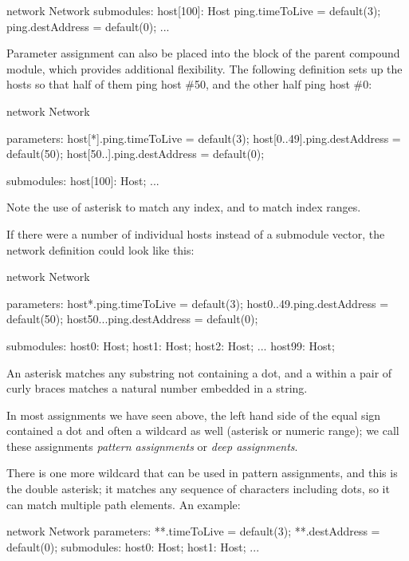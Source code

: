 \begin{ned}
network Network
{
    submodules:
        host[100]: Host {
            ping.timeToLive = default(3);
            ping.destAddress = default(0);
        }
        ...
}
\end{ned}

Parameter assignment can also be placed into the  block of the
parent compound module, which provides additional flexibility. The following
definition sets up the hosts so that half of them ping host \#50, and the other
half ping host \#0:

\begin{ned}
network Network
{
    parameters:
        host[*].ping.timeToLive = default(3);
        host[0..49].ping.destAddress = default(50);
        host[50..].ping.destAddress = default(0);

    submodules:
        host[100]: Host;
        ...
}
\end{ned}

Note the use of asterisk to match any index, and  to match index ranges.

If there were a number of individual hosts instead of a submodule vector, the
network definition could look like this:

\begin{ned}
network Network
{
    parameters:
        host*.ping.timeToLive = default(3);
        host{0..49}.ping.destAddress = default(50);
        host{50..}.ping.destAddress = default(0);

    submodules:
        host0: Host;
        host1: Host;
        host2: Host;
        ...
        host99: Host;
}
\end{ned}

An asterisk matches any substring not containing a dot, and a  within a
pair of curly braces matches a natural number embedded in a string.

In most assignments we have seen above, the left hand side of the equal sign
contained a dot and often a wildcard as well (asterisk or numeric range); we
call these assignments \textit{pattern assignments} or \textit{deep
assignments}.

There is one more wildcard that can be used in pattern assignments, and this is
the double asterisk; it matches any sequence of characters including dots, so it
can match multiple path elements. An example:

\begin{ned}
network Network
{
    parameters:
        **.timeToLive = default(3);
        **.destAddress = default(0);
    submodules:
        host0: Host;
        host1: Host;
        ...
}
\end{ned}

